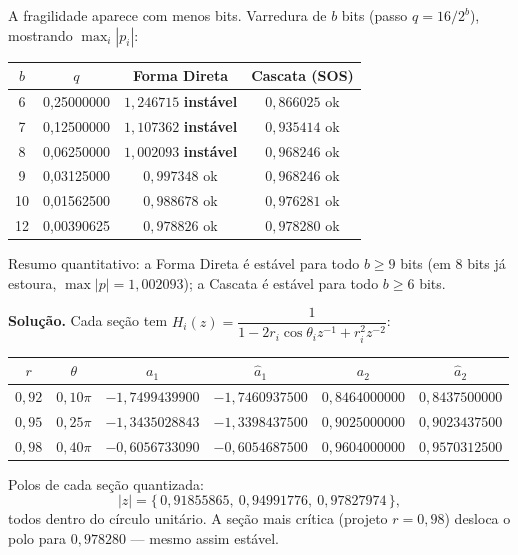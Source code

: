 A fragilidade aparece com menos bits. Varredura de $b$ bits (passo
$q=16/2^{b}$), mostrando $\max_i|p_i|$:
\begin{center}
\begin{tabular}{cccc}
\toprule
$b$ & $q$ & Forma Direta & Cascata (SOS)\\
\midrule
6  & 0{,}25000000 & $1{,}246715$ \textbf{instável} & $0{,}866025$ ok\\
7  & 0{,}12500000 & $1{,}107362$ \textbf{instável} & $0{,}935414$ ok\\
8  & 0{,}06250000 & $1{,}002093$ \textbf{instável} & $0{,}968246$ ok\\
9  & 0{,}03125000 & $0{,}997348$ ok & $0{,}968246$ ok\\
10 & 0{,}01562500 & $0{,}988678$ ok & $0{,}976281$ ok\\
12 & 0{,}00390625 & $0{,}978826$ ok & $0{,}978280$ ok\\
\bottomrule
\end{tabular}
\end{center}
Resumo quantitativo: a Forma Direta é estável para todo $b\ge9$ bits (em
$8$ bits já estoura, $\max|p|=1{,}002093$); a Cascata é estável para todo
$b\ge6$ bits.



\textbf{Solução.} Cada seção tem
$H_i(z)=\dfrac{1}{1-2r_i\cos\theta_iz^{-1}+r_i^2z^{-2}}$:
\begin{center}
\begin{tabular}{cccccc}
\toprule
$r$ & $\theta$ & $a_1$ & $\hat{a}_1$ & $a_2$ & $\hat{a}_2$\\
\midrule
$0{,}92$ & $0{,}10\pi$ & $-1{,}7499439900$ & $-1{,}7460937500$ & $0{,}8464000000$ & $0{,}8437500000$\\
$0{,}95$ & $0{,}25\pi$ & $-1{,}3435028843$ & $-1{,}3398437500$ & $0{,}9025000000$ & $0{,}9023437500$\\
$0{,}98$ & $0{,}40\pi$ & $-0{,}6056733090$ & $-0{,}6054687500$ & $0{,}9604000000$ & $0{,}9570312500$\\
\bottomrule
\end{tabular}
\end{center}
Polos de cada seção quantizada:
\[
  |z|=\{\,0{,}91855865,\ 0{,}94991776,\ 0{,}97827974\,\},
\]
todos dentro do círculo unitário. A seção mais crítica (projeto $r=0{,}98$)
desloca o polo para $0{,}978280$ — mesmo assim estável.

